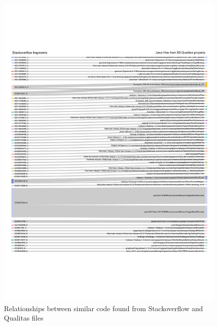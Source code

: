 \documentclass{IEEEtran}
\begin{document}
\begin{figure}[H]
	\centering
	\includegraphics[width=1\linewidth]{Sankey}
	\caption{Relationships between similar code found from Stackoverflow and Qualitas files}
	\label{fig:sankey}
\end{figure}
\end{document}
